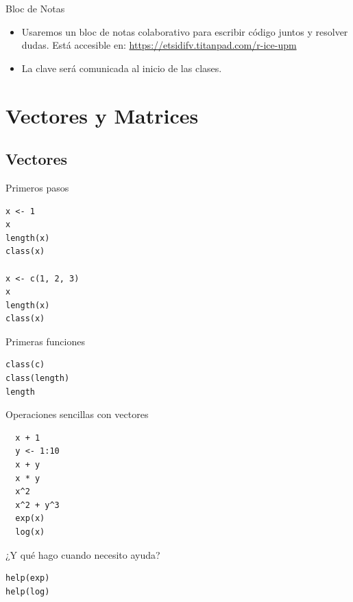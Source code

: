 \documentclass[xcolor={usenames,svgnames,dvipsnames}]{beamer}
\begin{document}
\begin{frame}[label=sec-1-2-6]{Bloc de Notas}
\begin{itemize}
\item Usaremos un bloc de notas colaborativo para escribir código juntos y resolver dudas. Está accesible en: \url{https://etsidifv.titanpad.com/r-ice-upm}

\item La clave será comunicada al inicio de las clases.
\end{itemize}
\end{frame}


\section{Vectores y Matrices}
\label{sec-2}

\subsection{Vectores}
\label{sec-2-1}
\begin{frame}[fragile,label=sec-2-1-1]{Primeros pasos}
 \lstset{language=R,label= ,caption= ,numbers=none}
\begin{lstlisting}
x <- 1
x
length(x)
class(x)

x <- c(1, 2, 3)
x
length(x)
class(x)
\end{lstlisting}
\end{frame}

\begin{frame}[fragile,label=sec-2-1-2]{Primeras funciones}
 \lstset{language=R,label= ,caption= ,numbers=none}
\begin{lstlisting}
class(c)
class(length)
length
\end{lstlisting}
\end{frame}

\begin{frame}[fragile,label=sec-2-1-3]{Operaciones sencillas con vectores}
 \lstset{language=R,label= ,caption= ,numbers=none}
\begin{lstlisting}
  x + 1
  y <- 1:10
  x + y
  x * y
  x^2
  x^2 + y^3
  exp(x)
  log(x)
\end{lstlisting}
\end{frame}

\begin{frame}[fragile,label=sec-2-1-4]{¿Y qué hago cuando necesito ayuda?}
 \lstset{language=R,label= ,caption= ,numbers=none}
\begin{lstlisting}
help(exp)
help(log)
\end{lstlisting}
\end{frame}
\end{document}

